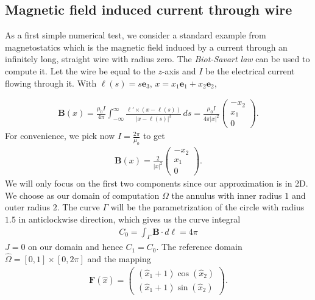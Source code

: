 \documentclass[../master_thesis.tex]{subfiles}
\begin{document}
\subsection{Magnetic field induced current through wire}
As a first simple numerical test, we consider a standard example from 
magnetostatics which is the magnetic field induced by a current through an infinitely long, 
straight wire with radius zero. The \textit{Biot-Savart law} can be used to compute it. 
Let the wire be equal to the $z$-axis and $I$ be the electrical current 
flowing through it. With $\bm{\ell}(s) = s \mathbf{e}_3$, $x = x_1 \mathbf{e}_1 +  x_2 \mathbf{e}_2$,

\begin{align*}
    \mathbf{B}(x) = \frac{\mu_0 I}{4\pi} \int_{-\infty}^\infty  
        \frac{\ell' \times (x - \ell(s))}{|x - \ell(s)|^3} \, ds
    = \frac{\mu_0 I}{4\pi |x|^2}  \begin{pmatrix}-x_2 \\ x_1 \\ 0 \end{pmatrix}.
\end{align*}
For convenience, we pick now $I = \frac{2 \pi}{\mu_0}$ to get 
\begin{align*}
    \mathbf{B}(x) = \frac{2}{|x|^2} \begin{pmatrix}-x_2 \\ x_1 \\ 0 \end{pmatrix}.
\end{align*}
We will only focus on the first two components since our approximation is in 2D.
We choose as our domain of computation $\Omega$ the annulus with 
inner radius $1$ and outer radius $2$. 
The curve $\Gamma$ will be the parametrization of the circle with radius 
$1.5$ in anticlockwise direction, which gives us the curve integral 
\begin{align*}
    C_0 = \int_\Gamma \mathbf{B}\cdot d\ell = 4\pi
\end{align*}
$J= 0$ on our domain and hence $C_1 = C_0$. 
The reference domain $\hat{\Omega} = [0,1] \times [0, 2\pi]$ and the mapping 
\begin{align*}
    \mathbf{F}(\hat{x}) = \begin{pmatrix}
            (\hat{x}_1 + 1)\cos(\hat{x}_2 ) 
            \\ (\hat{x}_1 + 1)\sin(\hat{x}_2 ) 
    \end{pmatrix}.
\end{align*}
\end{document}
